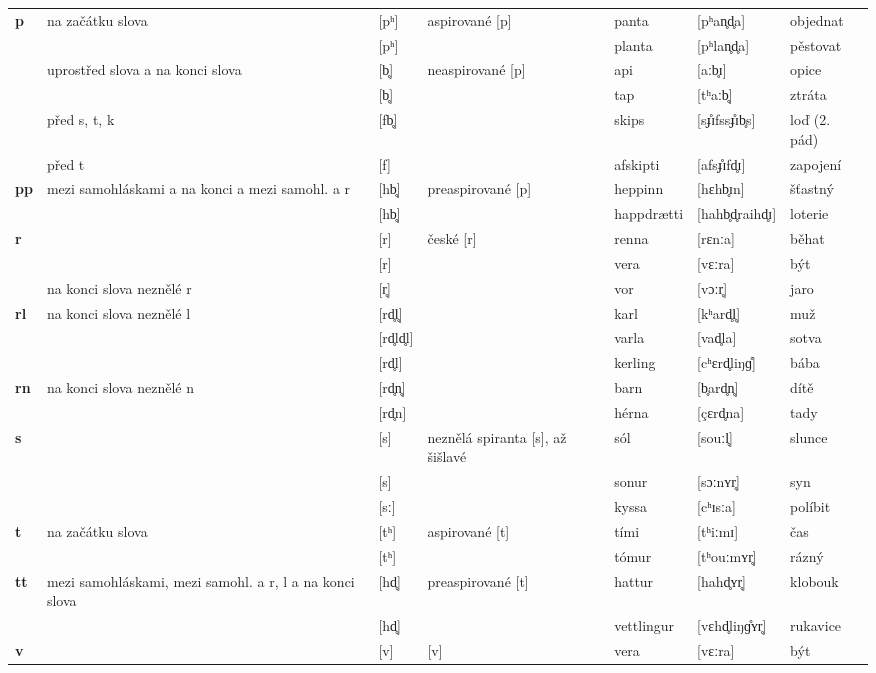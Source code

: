\begin{longtable}{>{\bfseries}lX>{\IPAFont}lXl>{\IPAFont}ll}
p & na začátku slova & {[pʰ]} & aspirované [p] & panta & {[pʰan̥d̥a]} & objednat \\ 
 &  & {[pʰ]} &   & planta & {[pʰlan̥d̥a]} & pěstovat \\ 
 & uprostřed slova a na konci slova & {[b̥]} & neaspirované [p] & api & {[aːb̥ɪ]} & opice \\ 
 &  & {[b̥]} &   & tap & {[tʰaːb̥]} & ztráta \\ 
 & před s, t, k & {[fb̥]} &  & skips & {[s\r ɟɪfss\r ɟɪb̥s]} & loď (2. pád) \\ 
 & před t & {[f]} &   & afskipti & {[afs\r ɟɪfd̥ɪ]} & zapojení \\ 
pp & mezi samohláskami a na konci a mezi samohl. a r & {[hb̥]} & preaspirované [p] & heppinn & {[hɛhb̥ɪn]} & šťastný \\ 
 &  & {[hb̥]} &   & happdrætti & {[hahb̥d̥raihd̥ɪ]} & loterie \\ 
r &  & {[r]} & české [r] & renna & {[rɛnːa]} & běhat \\ 
 &  & {[r]} &   & vera & {[vɛːra]} & být \\ 
 & na konci slova neznělé r & {[r̥]} &   & vor & {[vɔːr̥]} & jaro \\ 
rl & na konci slova neznělé l & {[rd̥l̥]} &  & karl & {[kʰard̥l̥]} & muž \\ 
 &  & {[rd̥ld̥l]} &   & varla & {[vad̥la]} & sotva \\ 
 &  & {[rd̥l]} &   & kerling & {[cʰɛrd̥liŋɡ̊]} & bába \\ 
rn & na konci slova neznělé n & {[rd̥n̥]} &  & barn & {[b̥ard̥n̥]} & dítě \\ 
 &  & {[rd̥n]} &   & hérna & {[çɛrd̥na]} & tady \\ 
s &  & {[s]} & neznělá spiranta [s], až šišlavé & sól & {[souːl̥]} & slunce \\ 
 &  & {[s]} &   & sonur & {[sɔːnʏr̥]} & syn \\ 
 &  & {[sː]} &   & kyssa & {[cʰɪsːa]} & políbit \\ 
t & na začátku slova & {[tʰ]} & aspirované [t] & tími & {[tʰiːmɪ]} & čas \\ 
 &  & {[tʰ]} &   & tómur & {[tʰouːmʏr̥]} & rázný \\ 
tt & mezi samohláskami, mezi samohl. a r, l a na konci slova & {[hd̥]} & preaspirované [t] & hattur & {[hahd̥ʏr̥]} & klobouk \\ 
 &  & {[hd̥]} &   & vettlingur & {[vɛhd̥liŋɡ̊ʏr̥]} & rukavice \\ 
v &  & {[v]} & [v] & vera  & {[vɛːra]} & být \\ 

\end{longtable}
